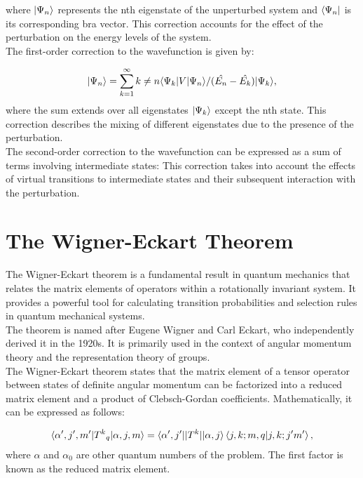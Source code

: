 \documentclass[a4paper,11pt]{article}
\DeclarePairedDelimiter\bra{\langle}{\rvert}
\DeclarePairedDelimiter\ket{\lvert}{\rangle}
\begin{document}
where $\ket{\Psi_n}$ represents the nth eigenstate of the unperturbed system and $\bra{\Psi_n}$ is its corresponding bra vector. This correction accounts for the effect of the perturbation on the energy levels of the system.
\\

The first-order correction to the wavefunction is given by:

\begin{equation}
\label{eq:First Order Correction to the Wavefunction}
\begin{aligned}
\ket{\Psi_n} = \sum_{k=1}^{\infty} k \neq n \bra{\Psi_k} V \ket{\Psi_n} / (\hat{E_n} - \hat{E_k})\ket{\Psi_k},
\end{aligned}
\end{equation}
where the sum extends over all eigenstates $\ket{\Psi_k}$ except the nth state. This correction describes the mixing of different eigenstates due to the presence of the perturbation.
\\
The second-order correction to the wavefunction can be expressed as a sum of terms involving intermediate states:
This correction takes into account the effects of virtual transitions to intermediate states and their subsequent interaction with the perturbation.
\\

\section{The Wigner-Eckart Theorem}
The Wigner-Eckart theorem is a fundamental result in quantum mechanics that relates the matrix elements of operators within a rotationally invariant system. It provides a powerful tool for calculating transition probabilities and selection rules in quantum mechanical systems.
\\

The theorem is named after Eugene Wigner and Carl Eckart, who independently derived it in the 1920s. It is primarily used in the context of angular momentum theory and the representation theory of groups.
\\

The Wigner-Eckart theorem states that the matrix element of a tensor operator between states of definite angular momentum can be factorized into a reduced matrix element and a product of Clebsch-Gordan coefficients. Mathematically, it can be expressed as follows:

\begin{equation}
\label{eq:Wigner Eckart Theorem}
\begin{aligned}
\bra{\alpha ', j', m'} {T^k}_q \ket{\alpha , j , m} = \bra{\alpha ', j'} |T^k|\ket{\alpha , j}   \braket{j,k;m,q}{j,k;j'm'},
\end{aligned}
\end{equation}
where $\alpha$ and $\alpha _0$ are other quantum numbers of the problem. The first factor is known as the reduced matrix element. 
\\
\end{document}
